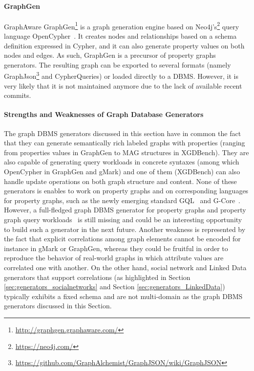 
\paragraph{GraphGen}  GraphAware GraphGen\footnote{\url{http://graphgen.graphaware.com/}} is a graph generation engine based on Neo4j's\footnote{\url{https://neo4j.com/}} query language OpenCypher~\cite{GraphGen}.  It creates nodes and relationships based on a schema definition expressed in Cypher, and it can also generate property values on both
nodes and edges. As such, GraphGen is a precursor of property graphs generators. The resulting graph can be exported to several formats (namely GraphJson\footnote{\url{https://github.com/GraphAlchemist/GraphJSON/wiki/GraphJSON}} and CypherQueries) or loaded directly to a DBMS. However, it is very likely that it is not maintained anymore due to the lack of available recent commits.

\paragraph{Strengths and Weaknesses of Graph Database Generators} 
The graph DBMS generators discussed in this section have in common the fact that they can generate semantically rich labeled graphs with properties (ranging from properties values in GraphGen to MAG structures in XGDBench). They are also capable of generating query workloads in 
concrete syntaxes (among which OpenCypher in GraphGen and gMark) and one of them (XGDBench) can also handle update operations on both graph structure and content.
None of these generators is enables to work on property graphs and on corresponding languages for property graphs, such as the newly emerging standard GQL~\cite{gql-2018} and G-Core~\cite{AnglesABBFGLPPS18}. However, a full-fledged graph DBMS generator for property graphs and property graph query workloads~\cite{BFVY18} is still missing and could be an interesting opportunity to build such a generator in the next future. 
Another weakness is represented by the fact that explicit correlations among graph elements cannot be encoded for instance in gMark or GraphGen, whereas they could be fruitful in order to reproduce the behavior of real-world graphs in which attribute values are correlated one with another. On the other hand, social network and Linked Data generators that support correlations (as highlighted in Section \ref{sec:generators_socialnetworks} and Section \ref{sec:generators_LinkedData}) typically exhibits a fixed schema and are not multi-domain as the graph DBMS generators discussed in this Section. 

 